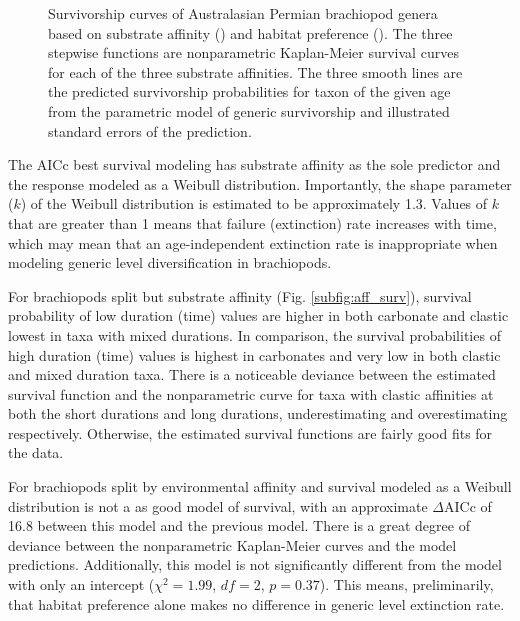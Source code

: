 \documentclass[12pt,letterpaper]{article}
\begin{document}
\begin{figure}[ht]
\begin{subfigure}[b]{0.5\textwidth}
      \label{subfig:env_surv}
    \end{subfigure}
    \caption{Survivorship curves of Australasian Permian brachiopod genera based on substrate affinity () and habitat preference (). The three stepwise functions are nonparametric Kaplan-Meier survival curves for each of the three substrate affinities. The three smooth lines are the predicted survivorship probabilities for taxon of the given age from the parametric model of generic survivorship and illustrated standard errors of the prediction.}
  \label{fig:brach_surv}
\end{figure}

The AICc best survival modeling has substrate affinity as the sole predictor and the response modeled as a Weibull distribution. Importantly, the shape parameter (\(k\)) of the Weibull distribution is estimated to be approximately 1.3. Values of \(k\) that are greater than 1 means that failure (extinction) rate increases with time, which may mean that an age-independent extinction rate is inappropriate when modeling generic level diversification in brachiopods. %

For brachiopods split but substrate affinity (Fig. \ref{subfig:aff_surv}), survival probability of low duration (time) values are higher in both carbonate and clastic lowest in taxa with mixed durations. In comparison, the survival probabilities of high duration (time) values is highest in carbonates and very low in both clastic and mixed duration taxa. There is a noticeable deviance between the estimated survival function and the nonparametric curve for taxa with clastic affinities at both the short durations and long durations, underestimating and overestimating respectively. Otherwise, the estimated survival functions are fairly good fits for the data. 

For brachiopods split by environmental affinity and survival modeled as a Weibull distribution is not a as good model of survival, with an approximate \(\Delta\)AICc of 16.8 between this model and the previous model. There is a great degree of deviance between the nonparametric Kaplan-Meier curves and the model predictions. Additionally, this model is not significantly different from the model with only an intercept (\(\chi^{2} = 1.99\), \(df = 2\), \(p = 0.37\)). This means, preliminarily, that habitat preference alone makes no difference in generic level extinction rate.
\end{document}
